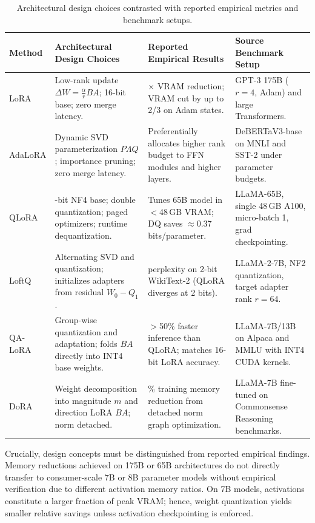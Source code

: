 \documentclass[11pt,a4paper]{article}
\begin{document}
\begin{table}[ht]
\centering
\scriptsize
\caption{Architectural design choices contrasted with reported empirical metrics and benchmark setups.}
\label{tab:comparison}
\begin{tabularx}{\textwidth}{l>{\raggedright\arraybackslash}p{3.1cm}>{\raggedright\arraybackslash}p{4.2cm}>{\raggedright\arraybackslash}X}
\toprule
\textbf{Method} & \textbf{Architectural Design Choices} & \textbf{Reported Empirical Results} & \textbf{Source Benchmark Setup} \\
\midrule
LoRA \cite{hu2021lora} & Low-rank update $\Delta W = \frac{\alpha}{r}BA$; 16-bit base; zero merge latency. & 3$\times$ VRAM reduction; VRAM cut by up to 2/3 on Adam states. & GPT-3 175B ($r=4$, Adam) and large Transformers. \\
AdaLoRA \cite{zhang2023adalora} & Dynamic SVD parameterization $P\Lambda Q$; importance pruning; zero merge latency. & Preferentially allocates higher rank budget to FFN modules and higher layers. & DeBERTaV3-base on MNLI and SST-2 under parameter budgets. \\
QLoRA \cite{dettmers2023qlora} & 4-bit NF4 base; double quantization; paged optimizers; runtime dequantization. & Tunes 65B model in $<$48\,GB VRAM; DQ saves $\approx$0.37 bits/parameter. & LLaMA-65B, single 48\,GB A100, micro-batch 1, grad checkpointing. \\
LoftQ \cite{li2023loftq} & Alternating SVD and quantization; initializes adapters from residual $W_0 - Q_1$. & 7.85 perplexity on 2-bit WikiText-2 (QLoRA diverges at 2 bits). & LLaMA-2-7B, NF2 quantization, target adapter rank $r=64$. \\
QA-LoRA \cite{xu2023qa} & Group-wise quantization and adaptation; folds $BA$ directly into INT4 base weights. & $>$50\% faster inference than QLoRA; matches 16-bit LoRA accuracy. & LLaMA-7B/13B on Alpaca and MMLU with INT4 CUDA kernels. \\
DoRA \cite{liu2024dora} & Weight decomposition into magnitude $m$ and direction LoRA $BA$; norm detached. & 24.4\% training memory reduction from detached norm graph optimization. & LLaMA-7B fine-tuned on Commonsense Reasoning benchmarks. \\
\bottomrule
\end{tabularx}
\end{table}

Crucially, design concepts must be distinguished from reported empirical findings. Memory reductions achieved on 175B or 65B architectures do not directly transfer to consumer-scale 7B or 8B parameter models without empirical verification due to different activation memory ratios. On 7B models, activations constitute a larger fraction of peak VRAM; hence, weight quantization yields smaller relative savings unless activation checkpointing is enforced.
\end{document}
